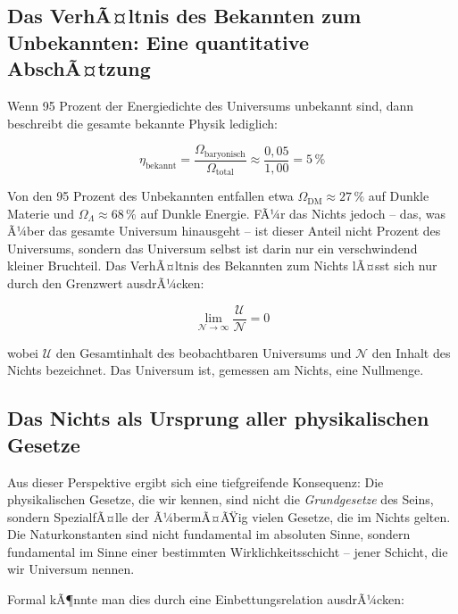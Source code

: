 ﻿\documentclass[12pt,a4paper]{report}
\begin{document}
\subsection{Das VerhÃ¤ltnis des Bekannten zum Unbekannten: Eine quantitative AbschÃ¤tzung}

Wenn 95 Prozent der Energiedichte des Universums unbekannt sind, dann beschreibt die gesamte bekannte Physik lediglich:

\begin{equation}
	\eta_{\text{bekannt}} = \frac{\Omega_{\text{baryonisch}}}{\Omega_{\text{total}}} \approx \frac{0{,}05}{1{,}00} = 5\,\%
	\label{eq:eta_bekannt}
\end{equation}

Von den 95 Prozent des Unbekannten entfallen etwa $\Omega_{\text{DM}} \approx 27\,\%$ auf Dunkle Materie und $\Omega_{\Lambda} \approx 68\,\%$ auf Dunkle Energie. FÃ¼r das Nichts jedoch -- das, was Ã¼ber das gesamte Universum hinausgeht -- ist dieser Anteil nicht  Prozent des Universums\grqq{}, sondern das Universum selbst ist darin nur ein verschwindend kleiner Bruchteil. Das VerhÃ¤ltnis des Bekannten zum Nichts lÃ¤sst sich nur durch den Grenzwert ausdrÃ¼cken:

\begin{equation}
	\lim_{\mathcal{N} \to \infty} \frac{\mathcal{U}}{\mathcal{N}} = 0
	\label{eq:verhÃ¤ltnis_universum_nichts}
\end{equation}

wobei $\mathcal{U}$ den Gesamtinhalt des beobachtbaren Universums und $\mathcal{N}$ den Inhalt des Nichts bezeichnet. Das Universum ist, gemessen am Nichts, eine Nullmenge.

\subsection{Das Nichts als Ursprung aller physikalischen Gesetze}

Aus dieser Perspektive ergibt sich eine tiefgreifende Konsequenz: Die physikalischen Gesetze, die wir kennen, sind nicht die \emph{Grundgesetze} des Seins, sondern SpezialfÃ¤lle der Ã¼bermÃ¤ÃŸig vielen Gesetze, die im Nichts gelten. Die Naturkonstanten sind nicht \glqq fundamental\grqq{} im absoluten Sinne, sondern \glqq fundamental\grqq{} im Sinne einer bestimmten Wirklichkeitsschicht -- jener Schicht, die wir \glqq Universum\grqq{} nennen.

Formal kÃ¶nnte man dies durch eine Einbettungsrelation ausdrÃ¼cken:
\end{document}
